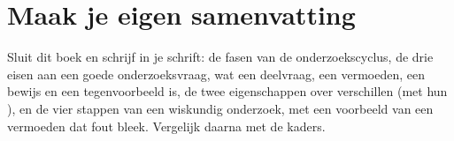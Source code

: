 \begin{oefeningen}




\end{oefeningen}


\ifzelfstudie
\section*{Maak je eigen samenvatting}
Sluit dit boek en schrijf in je schrift: de fasen van de onderzoekscyclus, de drie eisen aan een goede onderzoeksvraag, wat een deelvraag, een vermoeden, een bewijs en een tegenvoorbeeld is, de twee eigenschappen over verschillen (met hun ), en de vier stappen van een wiskundig onderzoek, met een voorbeeld van een vermoeden dat fout bleek. Vergelijk daarna met de kaders.
\fi
